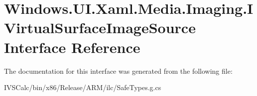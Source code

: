 \hypertarget{interface_windows_1_1_u_i_1_1_xaml_1_1_media_1_1_imaging_1_1_i_virtual_surface_image_source}{}\section{Windows.\+U\+I.\+Xaml.\+Media.\+Imaging.\+I\+Virtual\+Surface\+Image\+Source Interface Reference}
\label{interface_windows_1_1_u_i_1_1_xaml_1_1_media_1_1_imaging_1_1_i_virtual_surface_image_source}


The documentation for this interface was generated from the following file\+:\begin{DoxyCompactItemize}
\item 
I\+V\+S\+Calc/bin/x86/\+Release/\+A\+R\+M/ilc/Safe\+Types.\+g.\+cs\end{DoxyCompactItemize}
